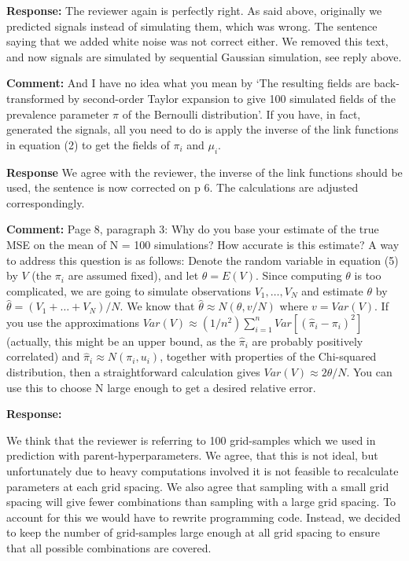 \documentclass{letter}
\begin{document}
\begin{letter}
\textbf{Response:}
The reviewer again is  perfectly right. As said above, originally we predicted signals instead of simulating them, which was wrong. The sentence saying that we added white noise was not correct either. We removed this text, and now signals are simulated by sequential Gaussian simulation, see reply above. 

\textbf{Comment:} 
And I have no idea what you mean by `The resulting fields are back-transformed by second-order Taylor expansion to give 100 simulated fields of the prevalence parameter $\pi$ of the Bernoulli distribution'. 
If you have, in fact, generated the signals, all you need to do is apply the inverse of the link functions in equation (2) to get the fields of $\pi_i$ and $\mu_i$.

\textbf{Response}
We agree with the reviewer, the inverse of the link functions should be used, the sentence is now corrected on p 6. The calculations are adjusted correspondingly.

\textbf{Comment:} 
Page 8, paragraph 3: Why do you base your estimate of the true MSE on the mean of N = 100 simulations? How accurate is this estimate?  
A way to address this question is as follows: Denote the random variable in equation (5) by $V$ (the $\pi_i$  are assumed fixed), and let $\theta = E(V)$.  Since computing $\theta$ is too complicated, we are going to simulate observations $V_{1} , \ldots, V_{N}$ and estimate $\theta$ by $\hat\theta = (V_{1} + \ldots + V_{N})/N$.  We know that $\hat\theta \approx N(\theta, v/N)$ where $v = Var(V )$.  If you use the approximations $Var(V) \approx (1/n^2) \sum_{i=1}^{n} Var[(\hat\pi_i - \pi_i)^2]$ (actually, this might be an upper bound, as the $\hat\pi_i$ are probably positively correlated) and $\hat\pi_i \approx N (\pi_i, u_i)$, together with properties of the Chi-squared distribution, then a straightforward calculation gives $Var(V) \approx 2\theta/N$.  You can use this to choose N large enough to get a desired relative error.

\textbf{Response:}

We think that the reviewer is referring to 100 grid-samples which we used in prediction with parent-hyperparameters.  We agree, that this is not ideal, but unfortunately due to heavy computations involved it is not feasible to recalculate parameters at each grid spacing.  We also agree that sampling with a small grid spacing will give fewer combinations than sampling with a large grid spacing. To account for this we would have to rewrite programming code. Instead, we decided to keep the number of grid-samples large enough at all grid spacing to ensure that all possible combinations are covered.  


\end{letter}
\end{document}
